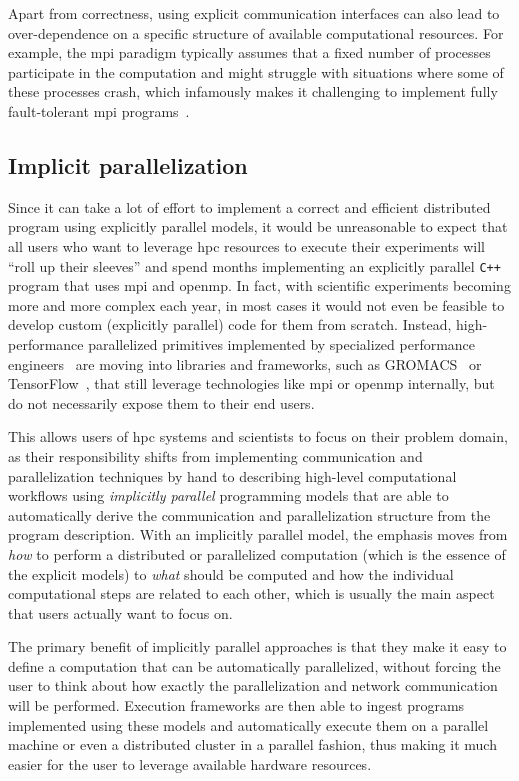 Apart from correctness, using explicit communication interfaces can also lead to over-dependence on
a specific structure of available computational resources. For example, the \gls{mpi}
paradigm typically assumes that a fixed number of processes participate in the computation and
might struggle with situations where some of these processes crash, which infamously makes it
challenging to implement fully fault-tolerant \gls{mpi}
programs~\cite{fault_tolerant_mpi}.

\subsection*{Implicit parallelization}
Since it can take a lot of effort to implement a correct and efficient distributed program using
explicitly parallel models, it would be unreasonable to expect that all users who want to leverage
\gls{hpc} resources to execute their experiments will ``roll up their sleeves'' and
spend months implementing an explicitly parallel \texttt{C++} program that uses
\gls{mpi} and \gls{openmp}. In fact, with scientific experiments becoming
more and more complex each year, in most cases it would not even be feasible to develop custom
(explicitly parallel) code for them from scratch. Instead, high-performance parallelized primitives
implemented by specialized performance engineers~\cite{dace} are moving into libraries
and frameworks, such as GROMACS~\cite{gromacs,gromacs_mpi} or TensorFlow~\cite{tensorflow,horovod}, that
still leverage technologies like \gls{mpi} or \gls{openmp} internally, but
do not necessarily expose them to their end users.

This allows users of \gls{hpc} systems and scientists to focus on their problem
domain, as their responsibility shifts from implementing communication and parallelization
techniques by hand to describing high-level computational workflows using \emph{implicitly parallel}
programming models that are able to automatically derive the communication and parallelization
structure from the program description. With an implicitly parallel model, the emphasis moves from
\emph{how} to perform a distributed or parallelized computation (which is the essence
of the explicit models) to \emph{what} should be computed and how the individual
computational steps are related to each other, which is usually the main aspect that users actually
want to focus on.

The primary benefit of implicitly parallel approaches is that they make it easy to define a
computation that can be automatically parallelized, without forcing the user to think about how
exactly the parallelization and network communication will be performed. Execution frameworks are
then able to ingest programs implemented using these models and automatically execute them on a
parallel machine or even a distributed cluster in a parallel fashion, thus making it much easier
for the user to leverage available hardware resources.

